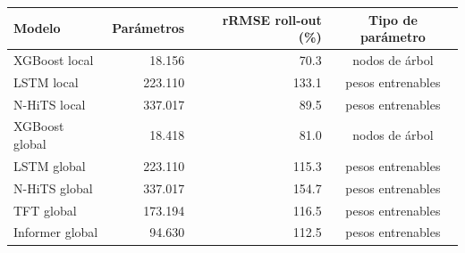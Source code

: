 \begin{tabular}{lrrc}
\toprule
Modelo & Parámetros & rRMSE roll-out (\%) & Tipo de parámetro \\
\midrule
XGBoost local & 18.156 & 70.3 & nodos de árbol \\
LSTM local & 223.110 & 133.1 & pesos entrenables \\
N-HiTS local & 337.017 & 89.5 & pesos entrenables \\
XGBoost global & 18.418 & 81.0 & nodos de árbol \\
LSTM global & 223.110 & 115.3 & pesos entrenables \\
N-HiTS global & 337.017 & 154.7 & pesos entrenables \\
TFT global & 173.194 & 116.5 & pesos entrenables \\
Informer global & 94.630 & 112.5 & pesos entrenables \\
\bottomrule
\end{tabular}